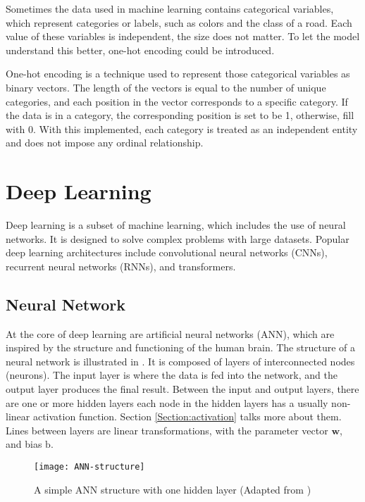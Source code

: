 Sometimes the data used in machine learning contains categorical variables, which represent categories or labels, such as colors and the class of a road.
Each value of these variables is independent, the size does not matter. To let the model understand this better, one-hot encoding could be introduced.

One-hot encoding is a technique used to represent those categorical variables as binary vectors. The length of the vectors is equal to the number of unique categories,
and each position in the vector corresponds to a specific category. If the data is in a category, the corresponding position is set to be 1, otherwise, fill with 0. 
With this implemented, each category is treated as an independent entity and does not impose any ordinal relationship. 

\section{Deep Learning}

Deep learning is a subset of machine learning, which includes the use of neural networks. It is designed to solve complex problems with large datasets. 
Popular deep learning architectures include convolutional neural networks (CNNs), recurrent neural networks (RNNs), and transformers.

\subsection{Neural Network}

At the core of deep learning are artificial neural networks (ANN), which are inspired by the structure and functioning of the human brain. 
The structure of a neural network is illustrated in . It is composed of layers of interconnected nodes (neurons). 
The input layer is where the data is fed into the network, and the output layer produces the final result. Between the input and output layers, there are one or more hidden layers 
each node in the hidden layers has a usually non-linear activation function. Section \ref{Section:activation} talks more about them. Lines between layers are linear transformations, 
with the parameter vector $\mathbf{w}$, and bias $\mathrm{b}$. 

\begin{figure}[!htb]
    \centering
    \texttt{[image: ANN-structure]}
    \caption{A simple ANN structure with one hidden layer (Adapted from \cite{Kocadağlı})}
    \label{Figure:ANN-structure}
\end{figure}

